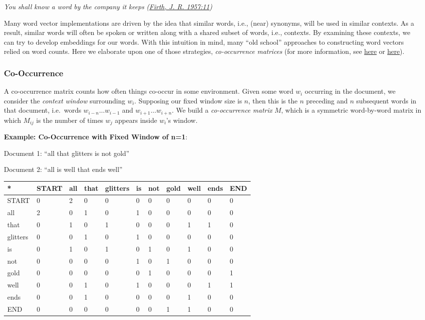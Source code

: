 \documentclass[11pt]{article}
\begin{document}
\emph{You shall know a word by the company it keeps
(\href{https://en.wikipedia.org/wiki/John_Rupert_Firth}{Firth, J. R.
1957:11})}

Many word vector implementations are driven by the idea that similar
words, i.e., (near) synonyms, will be used in similar contexts. As a
result, similar words will often be spoken or written along with a
shared subset of words, i.e., contexts. By examining these contexts, we
can try to develop embeddings for our words. With this intuition in
mind, many ``old school'' approaches to constructing word vectors relied
on word counts. Here we elaborate upon one of those strategies,
\emph{co-occurrence matrices} (for more information, see
\href{http://web.stanford.edu/class/cs124/lec/vectorsemantics.video.pdf}{here}
or
\href{https://medium.com/data-science-group-iitr/word-embedding-2d05d270b285}{here}).

    \hypertarget{co-occurrence}{%
\subsubsection{Co-Occurrence}\label{co-occurrence}}

A co-occurrence matrix counts how often things co-occur in some
environment. Given some word \(w_i\) occurring in the document, we
consider the \emph{context window} surrounding \(w_i\). Supposing our
fixed window size is \(n\), then this is the \(n\) preceding and \(n\)
subsequent words in that document, i.e.~words \(w_{i-n} \dots w_{i-1}\)
and \(w_{i+1} \dots w_{i+n}\). We build a \emph{co-occurrence matrix}
\(M\), which is a symmetric word-by-word matrix in which \(M_{ij}\) is
the number of times \(w_j\) appears inside \(w_i\)'s window.

\textbf{Example: Co-Occurrence with Fixed Window of n=1}:

Document 1: ``all that glitters is not gold''

Document 2: ``all is well that ends well''

\begin{longtable}[]{@{}lllllllllll@{}}
\toprule
* & START & all & that & glitters & is & not & gold & well & ends &
END\tabularnewline
\midrule
\endhead
START & 0 & 2 & 0 & 0 & 0 & 0 & 0 & 0 & 0 & 0\tabularnewline
all & 2 & 0 & 1 & 0 & 1 & 0 & 0 & 0 & 0 & 0\tabularnewline
that & 0 & 1 & 0 & 1 & 0 & 0 & 0 & 1 & 1 & 0\tabularnewline
glitters & 0 & 0 & 1 & 0 & 1 & 0 & 0 & 0 & 0 & 0\tabularnewline
is & 0 & 1 & 0 & 1 & 0 & 1 & 0 & 1 & 0 & 0\tabularnewline
not & 0 & 0 & 0 & 0 & 1 & 0 & 1 & 0 & 0 & 0\tabularnewline
gold & 0 & 0 & 0 & 0 & 0 & 1 & 0 & 0 & 0 & 1\tabularnewline
well & 0 & 0 & 1 & 0 & 1 & 0 & 0 & 0 & 1 & 1\tabularnewline
ends & 0 & 0 & 1 & 0 & 0 & 0 & 0 & 1 & 0 & 0\tabularnewline
END & 0 & 0 & 0 & 0 & 0 & 0 & 1 & 1 & 0 & 0\tabularnewline
\bottomrule
\end{longtable}
\end{document}
